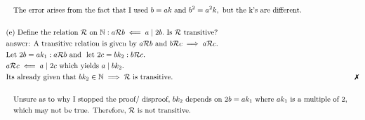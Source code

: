 \documentclass{article}
\begin{document}
\begin{align*}
            &\quad\text{The error arises from the fact that I used }b = ak \text{ and } b^2 = a^2k,\text{ but the k's are different.}\\
            &\\
            &\text{(e) Define the relation }\rel \text{ on }\N : a\rel b \impliedby a\mid 2b. \text{ Is }\rel \text{ transitive?}\\
            &\text{answer: A transitive relation is given by }a\rel b\text{ and } b \rel c \implies a\rel c.\\
            &\text{Let } 2b = ak_1 : a\rel b \AND\LET 2c = bk_2 : b \rel c.\\
            &a \rel c \impliedby a \mid 2c \text{ which yields } a\mid bk_2.\\
            &\text{Its already given that }bk_2\inn\implies \rel \text{ is transitive.}& \xmark\\
            &\\
            &\quad\text{Unsure as to why I stopped the proof/ disproof, }bk_2\text{ depends on } 2b=ak_1\text{ where } ak_1 \text{ is a multiple of 2,}\\
            &\quad\text{which may not be true. Therefore, }\rel \text{ is not transitive.}\\
        \end{align*}
    
\end{document}
